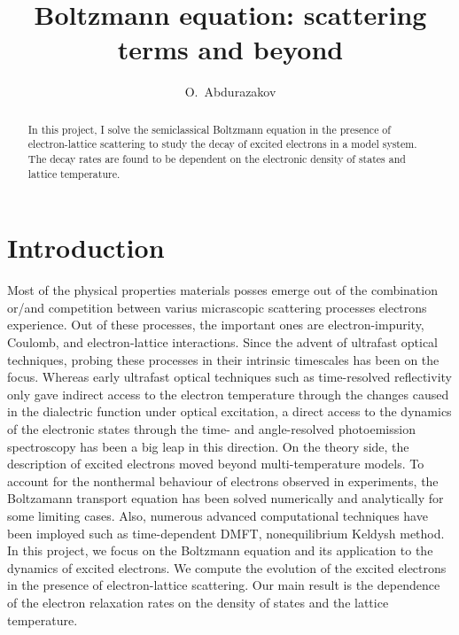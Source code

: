 \documentclass[aps,prl,twocolumn,showpacs,floatfix,superscriptaddress]{revtex4-1}
\begin{document}
\title{Boltzmann equation: scattering terms and beyond}
\author{O.~Abdurazakov}

\begin{abstract}
In this project, I solve the semiclassical Boltzmann equation in the presence of electron-lattice scattering to study the decay of excited electrons in a model system. The decay rates are found to be dependent on the electronic density of states and lattice temperature.   
\end{abstract}

\maketitle

\section{Introduction}

Most of the physical properties materials posses emerge out of the combination or/and competition between varius micrascopic scattering processes electrons experience. Out of these processes, the important ones are electron-impurity, Coulomb, and electron-lattice interactions. Since the advent of ultrafast optical techniques, probing these processes in their intrinsic timescales has been on the focus\cite{giannetti}. Whereas early ultrafast optical techniques such as time-resolved reflectivity only gave indirect access to the electron temperature through the changes caused in the dialectric function under optical excitation,  a direct access to the dynamics of the electronic states through the time- and angle-resolved photoemission spectroscopy has been a big leap in this direction\cite{giannetti}. On the theory side, the description of excited electrons moved beyond multi-temperature models.  To account for the nonthermal behaviour of electrons observed in experiments, the Boltzamann transport equation has been solved numerically\cite{BTE} and analytically for some limiting cases\cite{Kabanov}. Also, numerous advanced computational techniques have been imployed such as time-dependent DMFT\cite{NEDMFT}, nonequilibrium Keldysh method\cite{SentefPRX, KemperPRB}. In this project, we focus on the Boltzmann equation and its application to the dynamics of excited electrons. We compute the evolution of the excited electrons in the presence of electron-lattice scattering. Our main result is the dependence of the electron relaxation rates on the density of states and the lattice temperature. 
\end{document}
